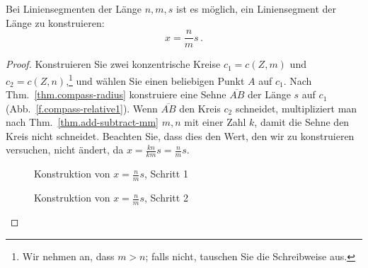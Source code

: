 \begin{theorem}\label{thm.compass-ratio}
Bei Liniensegmenten der Länge $n,m,s$ ist es möglich, ein Liniensegment der Länge zu konstruieren:
\[
x = \frac{n}{m}s\,.
\]
\end{theorem}

\begin{proof}
Konstruieren Sie zwei konzentrische Kreise $c_1 = c(Z,m)$ und $c_2 = c(Z,n)$,\footnote{Wir nehmen an, dass $m>n$; falls nicht, tauschen Sie die Schreibweise aus.} und wählen Sie einen beliebigen Punkt $A$ auf $c_1$. Nach Thm.~\ref{thm.compass-radius} konstruiere eine Sehne $\overline{AB}$ der Länge $s$ auf $c_1$ (Abb.~\ref{f.compass-relative1}). Wenn $\overline{AB}$ den Kreis $c_2$ schneidet, multipliziert man nach Thm.~\ref{thm.add-subtract-mm} $m,n$ mit einer Zahl $k$, damit die Sehne den Kreis nicht schneidet. Beachten Sie, dass dies den Wert, den wir zu konstruieren versuchen, nicht ändert, da $x=\displaystyle\frac{kn}{km}s=\displaystyle\frac{n}{m}s$.

\begin{figure}[b]
\begin{minipage}{.45\textwidth}
\begin{center}
\caption{Konstruktion von $x=\frac{n}{m}s$, Schritt 1}\label{f.compass-relative1}
\end{center}
\end{minipage}
\hfill
\begin{minipage}{.45\textwidth}
\begin{center}
\caption{Konstruktion von $x=\frac{n}{m}s$, Schritt 2}\label{f.compass-relative2}
\end{center}
\end{minipage}
\end{figure}


\end{proof}
